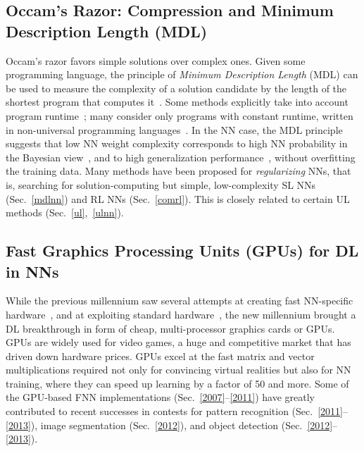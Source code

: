 \documentclass[letterpaper]{article}
\begin{document}
\begin{sloppypar}
\subsection{Occam's Razor: Compression and Minimum Description Length (MDL)}
\label{mdl}

Occam's razor favors simple solutions over complex ones.
Given some programming language,
the principle of {\em Minimum Description Length} (MDL) can be used 
to measure the complexity of a solution candidate by
the length of the shortest program that 
computes it~\citep[e.g.,][]{Solomonoff:64,Kolmogorov:65,Chaitin:66,Wallace:68,Levin:73a,Solomonoff:78,Rissanen:86,Blumer:87,LiVitanyi:97,gruenwald2005}.
Some methods explicitly take into account program runtime~\citep{Allender:92,Watanabe:92,Schmidhuber:97nn+,Schmidhuber:02colt}; 
many consider only programs with constant runtime, written
in non-universal programming languages~\citep[e.g.,][]{Rissanen:86,Hinton:93}.
In the NN case, 
the MDL principle suggests that low NN weight complexity
corresponds to high NN probability 
in the  Bayesian view~\citep[e.g.,][]{MacKay:92b,Buntine:91,neal1995,freitas2003},
and to high generalization performance~\citep[e.g.,][]{BaumHaussler:89}, 
without overfitting the training data.
Many methods have been proposed for {\em regularizing} NNs, that is, 
searching for solution-computing but simple, low-complexity SL NNs (Sec.~\ref{mdlnn}) 
and RL NNs (Sec.~\ref{comrl}).
This is closely 
related to certain UL methods (Sec.~\ref{ul},~\ref{ulnn}).



\subsection{Fast Graphics Processing Units (GPUs) for DL in NNs}
\label{gpu}

While the previous millennium saw several attempts at creating fast NN-specific hardware~\citep[e.g.,][]{jackel-90,faggin92,ramacher93,widrow94,heemskerk1995,cbm97,urlbe1999},
and at exploiting standard hardware~\citep[e.g.,][]{anguita1994,muller1995,anguita1996},
the new millennium brought a DL breakthrough in form of cheap, multi-processor
graphics cards or GPUs. GPUs are widely used for video games, a huge and competitive market
that has driven down hardware prices.
GPUs excel at the fast matrix and vector multiplications required not only for 
convincing virtual realities but also for NN training, 
where they can speed up learning by a factor of  50 and more.
Some of the GPU-based FNN implementations (Sec.~\ref{2007}--\ref{2011}) have greatly contributed to recent successes in contests for pattern recognition (Sec.~\ref{2011}--\ref{2013}),
image segmentation (Sec.~\ref{2012}),
and object detection (Sec.~\ref{2012}--\ref{2013}).
 



\end{sloppypar}
\end{document}
